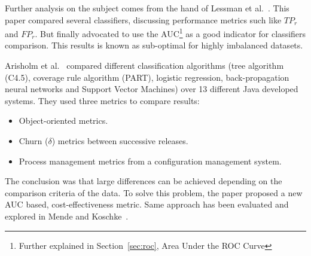 Further analysis on the subject comes from the hand of Lessman et 
al.~\cite{LBMP08}. This paper compared several classifiers, discussing 
performance metrics such like $TP_r$ and $FP_r$. But finally advocated to use 
the AUC\footnote{Further explained in Section~\ref{sec:roc}, Area Under the ROC 
Curve} as a good indicator for classifiers comparison. This results is known as 
sub-optimal for highly imbalanced datasets.

Arisholm et al.~\cite{ARISHOLM20102} compared different classification
algorithms (tree algorithm (C4.5), coverage rule algorithm (PART), logistic 
regression, back-propagation neural networks and Support Vector Machines) over 
13 different Java developed systems. They used three metrics to compare results:

\begin{itemize}
    \item Object-oriented metrics.
    \item Churn ($\delta$) metrics between successive releases.
    \item Process management metrics from a configuration management system.
\end{itemize}

The conclusion was that large differences can be achieved depending on the 
comparison criteria of the data. To solve this problem, the paper proposed a 
new AUC based, cost-effectiveness metric. Same approach has been evaluated and 
explored in Mende and Koschke~\cite{Mende10}.
